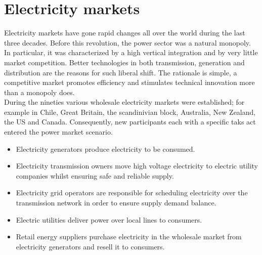 \section{Electricity markets}
Electricity markets have gone rapid changes all over the world during the last three decades.
Before this revolution, the power sector was a natural monopoly. In particular, it was characterized by a high vertical integration and by very little market competition. Better technologies in both transmission, generation and distribution are the reasons for such liberal shift. The rationale is simple, a competitive market promotes efficiency and stimulates technical innovation more than a monopoly does.
\\
During the nineties various wholesale electricity markets were established; for example in Chile, Great Britain, the scandinivian block, Australia, New Zealand, the US and Canada. Consequently, new participants each with a specific taks act entered the power market scenario.
\begin{itemize}
    \item Electricity generators produce electricity to be consumed.
    \item Electricity transmission owners 
    move high voltage electricity to electric utility companies whilst ensuring safe and reliable supply.
    \item Electricity grid operators are responsible for scheduling electricity over the transmission network in order to ensure supply demand balance.
    \item Electric utilities deliver power over local lines to consumers. 
    \item Retail energy suppliers purchase electricity in the wholesale market from electricity generators and resell it to consumers.
\end{itemize}



